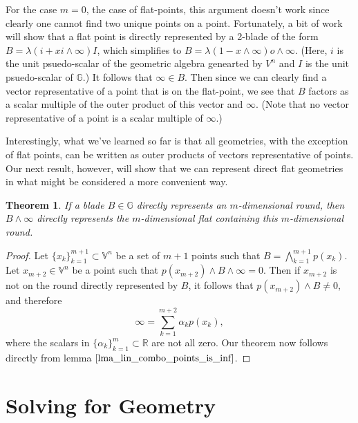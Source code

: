 \documentclass[12pt]{article}
\newcommand{\G}{\mathbb{G}}
\newcommand{\V}{\mathbb{V}}
\newcommand{\R}{\mathbb{R}}
\newcommand{\nvao}{o}
\newcommand{\nvai}{\infty}
\newtheorem{theorem}{Theorem}[section]
\begin{document}
For the case $m=0$, the case of flat-points, this argument doesn't work since clearly
one cannot find two unique points on a point.  Fortunately, a bit of work will show
that a flat point is directly represented by a 2-blade of the form $B=\lambda(i+xi\wedge\nvai)I$,
which simplifies to $B=\lambda(1-x\wedge\nvai)\nvao\wedge\nvai$.  (Here, $i$ is
the unit psuedo-scalar of the geometric algebra genearted by $V^n$ and $I$ is
the unit psuedo-scalar of $\G$.)  It follows that
$\nvai\in B$.  Then since we can clearly find a vector representative of a point
that is on the flat-point, we see that $B$ factors as a scalar multiple of the outer
product of this vector and $\nvai$.  (Note that no vector representative of a point
is a scalar multiple of $\nvai$.)

Interestingly, what we've learned so far is that all geometries,
with the exception of flat points, can be written as outer products
of vectors representative of points.  Our next result, however, will
show that we can represent direct flat geometries in what might be
considered a more convenient way.
\begin{theorem}\label{thm_round_to_flat}
If a blade $B\in\G$ directly represents an $m$-dimensional round,
then $B\wedge\nvai$ directly represents the $m$-dimensional flat
containing this $m$-dimensional round.
\end{theorem}
\begin{proof}
Let $\{x_k\}_{k=1}^{m+1}\subset\V^n$ be a set of $m+1$ points
such that $B=\bigwedge_{k=1}^{m+1} p(x_k)$.
Let $x_{m+2}\in\V^n$ be a point such that $p(x_{m+2})\wedge B\wedge\nvai=0$.
Then if $x_{m+2}$ is not on the round directly represented by $B$, it follows
that $p(x_{m+2})\wedge B\neq 0$, and therefore
\begin{equation*}
\nvai = \sum_{k=1}^{m+2}\alpha_k p(x_k),
\end{equation*}
where the scalars in $\{\alpha_k\}_{k=1}^m\subset\R$ are not all zero.
Our theorem now follows directly from lemma $\eqref{lma_lin_combo_points_is_inf}$.
\end{proof}

\section{Solving for Geometry}
\end{document}
